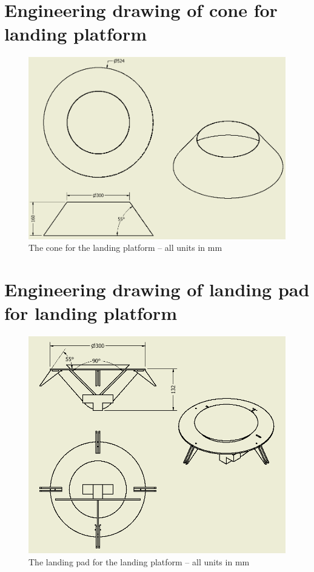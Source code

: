 \section{Engineering drawing of cone for landing platform}
\label{sec:app1}
\begin{figure}[H]
	\centering
	\includegraphics[width=1.1\textwidth, angle=270]{imgs/app1_cone_drawing}
	\caption{The cone for the landing platform -- all units in \si{\milli\meter}}
\end{figure}
\section{Engineering drawing of landing pad for landing platform}
\label{sec:app2}
\begin{figure}[H]
	\centering
	\includegraphics[width=1.1\textwidth, angle=270]{imgs/app2_landing_pad_drawing}
	\caption{The landing pad for the landing platform -- all units in \si{\milli\meter}}
\end{figure}
